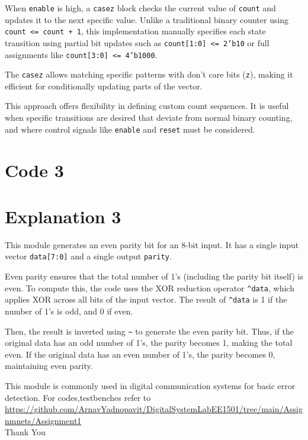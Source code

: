 \documentclass{article}
\begin{document}
When \texttt{enable} is high, a \texttt{casez} block checks the current value of \texttt{count} and updates it to the next specific value. Unlike a traditional binary counter using \texttt{count <= count + 1}, this implementation manually specifies each state transition using partial bit updates such as \texttt{count[1:0] <= 2'b10} or full assignments like \texttt{count[3:0] <= 4'b1000}.

The \texttt{casez} allows matching specific patterns with don’t care bits (\texttt{z}), making it efficient for conditionally updating parts of the vector.

This approach offers flexibility in defining custom count sequences. It is useful when specific transitions are desired that deviate from normal binary counting, and where control signals like \texttt{enable} and \texttt{reset} must be considered.


\section*{Code 3}


\section*{Explanation 3}

This module generates an even parity bit for an 8-bit input. It has a single input vector \texttt{data[7:0]} and a single output \texttt{parity}.

Even parity ensures that the total number of 1's (including the parity bit itself) is even. To compute this, the code uses the XOR reduction operator \texttt{\^{}data}, which applies XOR across all bits of the input vector. The result of \texttt{\^{}data} is 1 if the number of 1's is odd, and 0 if even.

Then, the result is inverted using \texttt{\~{}} to generate the even parity bit. Thus, if the original data has an odd number of 1's, the parity becomes 1, making the total even. If the original data has an even number of 1's, the parity becomes 0, maintaining even parity.

This module is commonly used in digital communication systems for basic error detection.
For codes,testbenches refer to \\
\url{https://github.com/ArnavYadnopavit/DigitalSystemLabEE1501/tree/main/Assignmnets/Assignment1}
\\

\centering
Thank You
\end{document}
